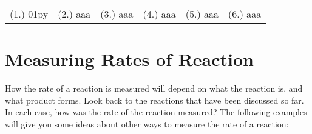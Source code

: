 {%
\par \practiceinfo
\par \begin{tabular}[h]{cccccc}
(1.)	01py	&
(2.)	aaa	&
(3.)	aaa	&
(4.)	aaa	&
(5.)	aaa	&
(6.)	aaa	\\
\end{tabular}
}






\section{Measuring Rates of Reaction}
\label{sec:reactionrates:measuring}

How the rate of a reaction is measured will depend on what the reaction is, and what product forms. Look back to the reactions that have been discussed so far. In each case, how was the rate of the reaction measured? The following examples will give you some ideas about other ways to measure the rate of a reaction:

